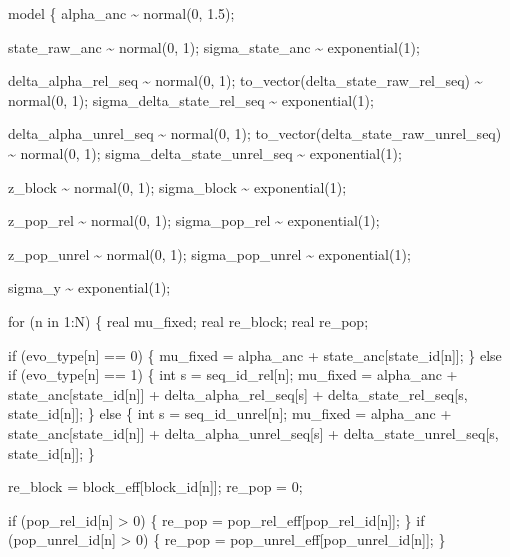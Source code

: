 \documentclass[
]{article}
\newenvironment{Shaded}{\begin{snugshade}}{\end{snugshade}}
\newcommand{\StringTok}[1]{\textcolor[rgb]{0.31,0.60,0.02}{#1}}
\begin{document}
\begin{Shaded}
\begin{Highlighting}[]
\StringTok{model \{}
\StringTok{  alpha\_anc \textasciitilde{} normal(0, 1.5);}

\StringTok{  state\_raw\_anc \textasciitilde{} normal(0, 1);}
\StringTok{  sigma\_state\_anc \textasciitilde{} exponential(1);}

\StringTok{  delta\_alpha\_rel\_seq \textasciitilde{} normal(0, 1);}
\StringTok{  to\_vector(delta\_state\_raw\_rel\_seq) \textasciitilde{} normal(0, 1);}
\StringTok{  sigma\_delta\_state\_rel\_seq \textasciitilde{} exponential(1);}

\StringTok{  delta\_alpha\_unrel\_seq \textasciitilde{} normal(0, 1);}
\StringTok{  to\_vector(delta\_state\_raw\_unrel\_seq) \textasciitilde{} normal(0, 1);}
\StringTok{  sigma\_delta\_state\_unrel\_seq \textasciitilde{} exponential(1);}

\StringTok{  z\_block \textasciitilde{} normal(0, 1);}
\StringTok{  sigma\_block \textasciitilde{} exponential(1);}

\StringTok{  z\_pop\_rel \textasciitilde{} normal(0, 1);}
\StringTok{  sigma\_pop\_rel \textasciitilde{} exponential(1);}

\StringTok{  z\_pop\_unrel \textasciitilde{} normal(0, 1);}
\StringTok{  sigma\_pop\_unrel \textasciitilde{} exponential(1);}

\StringTok{  sigma\_y \textasciitilde{} exponential(1);}

\StringTok{  for (n in 1:N) \{}
\StringTok{    real mu\_fixed;}
\StringTok{    real re\_block;}
\StringTok{    real re\_pop;}

\StringTok{    if (evo\_type[n] == 0) \{}
\StringTok{      mu\_fixed =}
\StringTok{        alpha\_anc +}
\StringTok{        state\_anc[state\_id[n]];}
\StringTok{    \} else if (evo\_type[n] == 1) \{}
\StringTok{      int s = seq\_id\_rel[n];}
\StringTok{      mu\_fixed =}
\StringTok{        alpha\_anc +}
\StringTok{        state\_anc[state\_id[n]] +}
\StringTok{        delta\_alpha\_rel\_seq[s] +}
\StringTok{        delta\_state\_rel\_seq[s, state\_id[n]];}
\StringTok{    \} else \{}
\StringTok{      int s = seq\_id\_unrel[n];}
\StringTok{      mu\_fixed =}
\StringTok{        alpha\_anc +}
\StringTok{        state\_anc[state\_id[n]] +}
\StringTok{        delta\_alpha\_unrel\_seq[s] +}
\StringTok{        delta\_state\_unrel\_seq[s, state\_id[n]];}
\StringTok{    \}}

\StringTok{    re\_block = block\_eff[block\_id[n]];}
\StringTok{    re\_pop = 0;}

\StringTok{    if (pop\_rel\_id[n] \textgreater{} 0) \{}
\StringTok{      re\_pop = pop\_rel\_eff[pop\_rel\_id[n]];}
\StringTok{    \}}
\StringTok{    if (pop\_unrel\_id[n] \textgreater{} 0) \{}
\StringTok{      re\_pop = pop\_unrel\_eff[pop\_unrel\_id[n]];}
\StringTok{    \}}


\end{Highlighting}
\end{Shaded}
\end{document}
